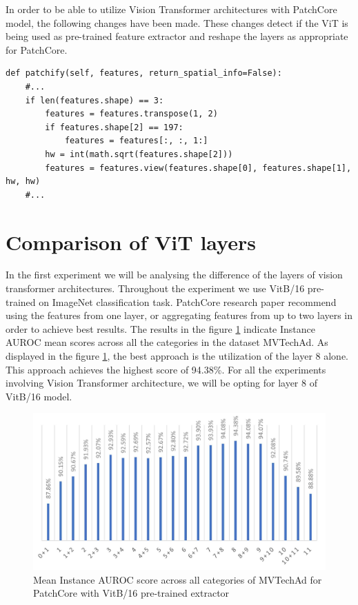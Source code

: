 In order to be able to utilize Vision Transformer architectures with PatchCore model, the following changes have been made. These changes detect if the ViT is being used as pre-trained feature extractor and reshape the layers as appropriate for PatchCore.

\begin{lstlisting}
def patchify(self, features, return_spatial_info=False):
	#...
	if len(features.shape) == 3:
		features = features.transpose(1, 2)
		if features.shape[2] == 197:
			features = features[:, :, 1:]
		hw = int(math.sqrt(features.shape[2]))
		features = features.view(features.shape[0], features.shape[1], hw, hw)
	#...
\end{lstlisting}

\section{Comparison of ViT layers}
\label{vit layers}

In the first experiment we will be analysing the difference of the layers of vision transformer architectures. Throughout the experiment we use VitB/16 pre-trained on ImageNet classification task. PatchCore research paper recommend using the features from one layer, or aggregating features from up to two layers in order to achieve best results. The results in the figure \ref{fig:vit_layers} indicate Instance AUROC mean scores across all the categories in the dataset MVTechAd. As displayed in the figure \ref{fig:vit_layers}, the best approach is the utilization of the layer 8 alone. This approach achieves the highest score of 94.38\%. For all the experiments involving Vision Transformer architecture, we will be opting for layer 8 of VitB/16 model.

\begin{figure}[h]
	\begin{center}
		\includegraphics[width=1.0\linewidth]{Chapter_4/vit.png}
	\end{center}
	\caption{Mean Instance AUROC score across all categories of MVTechAd for PatchCore with VitB/16 pre-trained extractor}
	\label{fig:vit_layers}
\end{figure}

